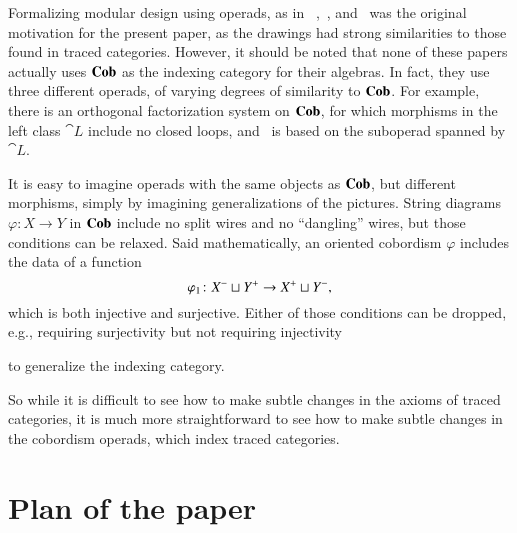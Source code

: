 \documentclass[12pt,oneside,article,draft]{memoir}
\begin{document}
Formalizing modular design using operads, as in ~\cite{Spivak},~\cite{RupelSpivak}, and~\cite{VagnerSpivakLerman} was the original motivation for the present paper, as the drawings had strong similarities to those found in traced categories.
However, it should be noted that none of these papers actually uses $\mathbf{Cob}$ as the indexing category for their algebras.
In fact, they use three different operads, of varying degrees of similarity to $\mathbf{Cob}$.
For example, there is an orthogonal factorization system on $\mathbf{Cob}$, for which morphisms in the left class $\cat{L}$ include no closed loops, and~\cite{VagnerSpivakLerman} is based on the suboperad spanned by $\cat{L}$.

It is easy to imagine operads with the same objects as $\mathbf{Cob}$, but different morphisms, simply by imagining generalizations of the pictures.
String diagrams $\varphi\colon X\to Y$ in $\mathbf{Cob}$ include no split wires and no ``dangling'' wires, but those conditions can be relaxed.
Said mathematically, an oriented cobordism $\varphi$ includes the data of a function
$$\varphi_1\colon X^-\sqcup Y^+\to X^+\sqcup Y^-,$$
which is both injective and surjective.
Either of those conditions can be dropped, e.g., requiring surjectivity but not requiring injectivity
\begin{center}
\end{center}
to generalize the indexing category. 

So while it is difficult to see how to make subtle changes in the axioms of traced categories, it is much more straightforward to see how to make subtle changes in the cobordism operads, which index traced categories.

\section{Plan of the paper}
\end{document}
